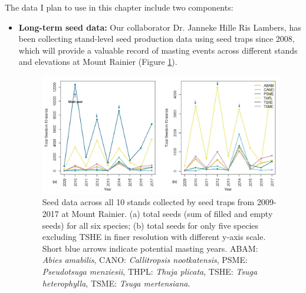 \documentclass[11pt,letter]{article}
\begin{document}
The data I plan to use in this chapter include two components:
\begin{itemize}
	\item \textbf{Long-term seed data:} Our collaborator Dr. Janneke Hille Ris Lambers, has been collecting stand-level seed production data using seed traps since 2008, which will provide a valuable record of masting events across different stands and elevations at Mount Rainier  (Figure \ref{fig:seed}).
\begin{figure}[H]
	\centering
	\includegraphics[width=1\linewidth]{Seed1.jpg}
	\caption{Seed data across all 10 stands collected by seed traps from 2009-2017 at Mount Rainier. (a) total seeds (sum of filled and empty seeds) for all six species; (b) total seeds for only five species excluding TSHE in finer resolution with different y-axis scale. Short blue arrows indicate potential masting years. ABAM: \textit{Abies amabilis}, CANO:  \textit{Callitropsis nootkatensis}, PSME: \textit{Pseudotsuga menziesii}, THPL: \textit{Thuja plicata}, TSHE: \textit{Tsuga heterophylla}, TSME: \textit{Tsuga mertensiana}.}
	\label{fig:seed}
\end{figure}


\end{itemize}
\end{document}
